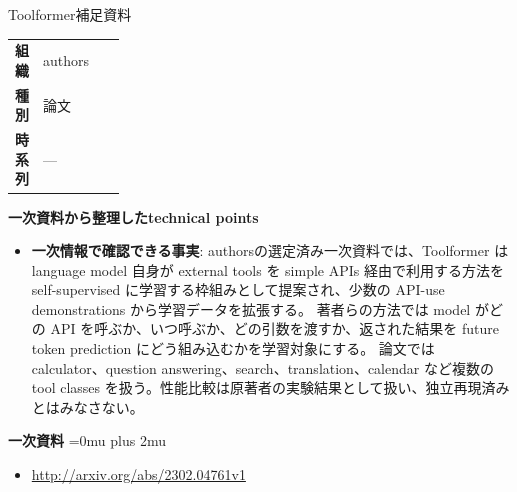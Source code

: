 \begin{technicalnote}{Toolformer}{補足資料}
\begingroup
\begin{tabularx}{\linewidth}{@{}>{\bfseries}p{0.22\linewidth}X@{}}
組織 & authors \\
種別 & 論文 \\
時系列 & — \\
\end{tabularx}
\smallskip
{\bfseries 一次資料から整理したtechnical points}
\begin{itemize}[leftmargin=1.5em,itemsep=0.35em]
\item \textbf{一次情報で確認できる事実}: authorsの選定済み一次資料では、Toolformer は language model 自身が external tools を simple APIs 経由で利用する方法を self-supervised に学習する枠組みとして提案され、少数の API-use demonstrations から学習データを拡張する。 著者らの方法では model がどの API を呼ぶか、いつ呼ぶか、どの引数を渡すか、返された結果を future token prediction にどう組み込むかを学習対象にする。 論文では calculator、question answering、search、translation、calendar など複数の tool classes を扱う。性能比較は原著者の実験結果として扱い、独立再現済みとはみなさない。
\end{itemize}
\begin{minipage}{\linewidth}
\begin{samepage}
{\bfseries 一次資料}
\begingroup\sloppy
\Urlmuskip=0mu plus 2mu\relax
\begin{itemize}[leftmargin=1.5em,itemsep=0.25em]
\item {\scriptsize\url{http://arxiv.org/abs/2302.04761v1}}
\end{itemize}
\endgroup
\end{samepage}
\end{minipage}
\endgroup
\end{technicalnote}
\medskip
